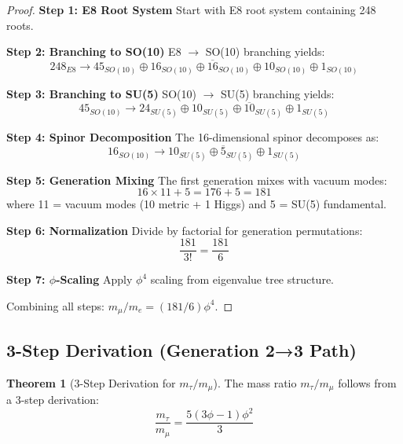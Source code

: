 \documentclass[11pt]{article}
\theoremstyle{definition}
\newtheorem{theorem}{Theorem}[section]
\newcommand{\goldenratio}{\phi}
\begin{document}
\begin{proof}
\textbf{Step 1: E8 Root System}
Start with E8 root system containing 248 roots.

\textbf{Step 2: Branching to SO(10)}
E8 $\to$ SO(10) branching yields:
\begin{equation}
248_{E8} \to 45_{SO(10)} \oplus 16_{SO(10)} \oplus \overline{16}_{SO(10)} \oplus 10_{SO(10)} \oplus 1_{SO(10)}
\end{equation}

\textbf{Step 3: Branching to SU(5)}
SO(10) $\to$ SU(5) branching yields:
\begin{equation}
45_{SO(10)} \to 24_{SU(5)} \oplus 10_{SU(5)} \oplus \overline{10}_{SU(5)} \oplus 1_{SU(5)}
\end{equation}

\textbf{Step 4: Spinor Decomposition}
The 16-dimensional spinor decomposes as:
\begin{equation}
16_{SO(10)} \to 10_{SU(5)} \oplus \overline{5}_{SU(5)} \oplus 1_{SU(5)}
\end{equation}

\textbf{Step 5: Generation Mixing}
The first generation mixes with vacuum modes:
\begin{equation}
16 \times 11 + 5 = 176 + 5 = 181
\end{equation}
where 11 = vacuum modes (10 metric + 1 Higgs) and 5 = SU(5) fundamental.

\textbf{Step 6: Normalization}
Divide by factorial for generation permutations:
\begin{equation}
\frac{181}{3!} = \frac{181}{6}
\end{equation}

\textbf{Step 7: $\goldenratio$-Scaling}
Apply $\goldenratio^4$ scaling from eigenvalue tree structure.

Combining all steps: $m_\mu/m_e = (181/6)\goldenratio^4$.
\end{proof}

\subsection{3-Step Derivation (Generation 2→3 Path)}

\begin{theorem}[3-Step Derivation for $m_\tau/m_\mu$]
The mass ratio $m_\tau/m_\mu$ follows from a 3-step derivation:
\begin{equation}
\frac{m_\tau}{m_\mu} = \frac{5(3\goldenratio-1)\goldenratio^2}{3}
\end{equation}
\end{theorem}
\end{document}
